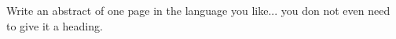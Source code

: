 Write an abstract of one page in the language you like... you don not even 
need to give it a heading.
